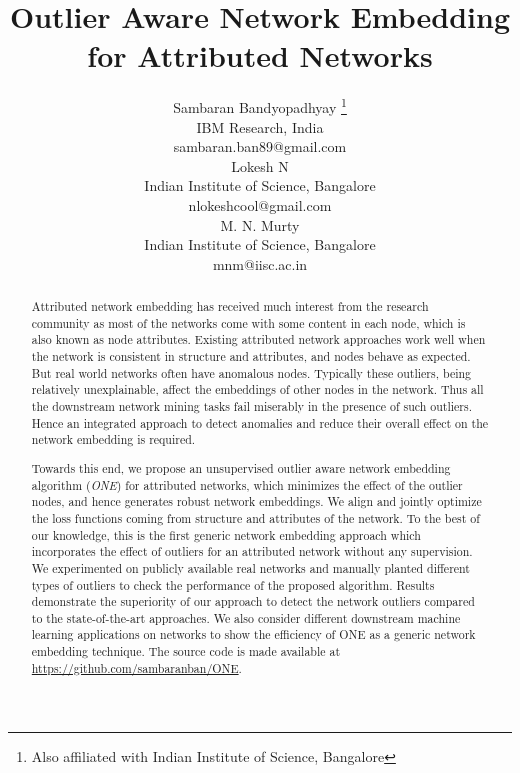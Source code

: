 \documentclass[letterpaper]{article} %
\begin{document}
%
\title{Outlier Aware Network Embedding for Attributed Networks}

\author{Sambaran Bandyopadhyay \thanks{Also affiliated with Indian Institute of Science, Bangalore}\\
IBM Research, India\\
sambaran.ban89@gmail.com \\
 \And Lokesh N \\ Indian Institute of Science, Bangalore \\ nlokeshcool@gmail.com\\ 
 \And M. N. Murty \\ Indian Institute of Science, Bangalore \\ mnm@iisc.ac.in}

\maketitle

\begin{abstract}
Attributed network embedding has received much interest from the research community as most of the networks come with some content in each node, which is also known as node attributes. Existing attributed network approaches work well when the network is consistent in structure and attributes, and nodes behave as expected. But real world networks often have anomalous nodes. Typically these outliers, being relatively unexplainable, affect the embeddings of other nodes in the network. Thus all the downstream network mining tasks fail miserably in the presence of such outliers. Hence an integrated approach to detect anomalies and reduce their overall effect on the network embedding is required.

Towards this end, we propose an unsupervised outlier aware network embedding algorithm (\textit{ONE}) for attributed networks, which minimizes the effect of the outlier nodes, and hence generates robust network embeddings. We align and jointly optimize the loss functions coming from structure and attributes of the network. To the best of our knowledge, this is the first generic network embedding approach which incorporates the effect of outliers for an attributed network without any supervision. We experimented on publicly available real networks and manually planted different types of outliers to check the performance of the proposed algorithm. Results demonstrate the superiority of our approach to detect the network outliers compared to the state-of-the-art approaches. We also consider different downstream machine learning applications on networks to show the efficiency of ONE as a generic network embedding technique. The source code is made available at \url{https://github.com/sambaranban/ONE}.
\end{abstract}
\end{document}
